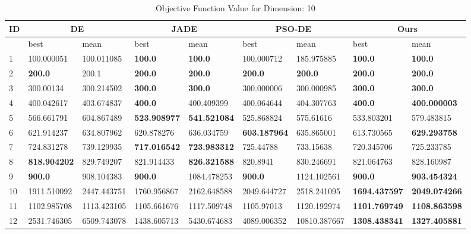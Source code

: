 \begingroup
\renewcommand\arraystretch{0.7}
\begin{table*}[b]
\centering
\caption{Objective Function Value for Dimension: 10}
 \begin{tabular}{|p{0.8cm}|p{1.6cm}|p{1.6cm}|p{1.6cm}|p{1.6cm}|p{1.6cm}|p{1.6cm}|p{1.6cm}|p{1.6cm}|} 
 \hline
 ID & \multicolumn{2}{c|}{DE} & \multicolumn{2}{c|}{JADE} & \multicolumn{2}{c|}{PSO-DE} & \multicolumn{2}{c|}{Ours} \\
 \hline
    & best & mean & best & mean & best & mean & best & mean \\ [0.5ex] 
 \hline
1  & 100.000051 & 100.011085 & \textbf{100.0} & \textbf{100.0} & 100.000712 & 185.975885 & \textbf{100.0} & \textbf{100.0} \\ 
2  & \textbf{200.0} & 200.1 & \textbf{200.0} & \textbf{200.0} & \textbf{200.0} & \textbf{200.0} & \textbf{200.0} & \textbf{200.0} \\ 
3  & 300.00134 & 300.214502 & \textbf{300.0} & \textbf{300.0} & 300.000006 & 300.000985 & \textbf{300.0} & \textbf{300.0} \\ 
4  & 400.042617 & 403.674837 & \textbf{400.0} & 400.409399 & 400.064644 & 404.307763 & \textbf{400.0} & \textbf{400.000003} \\ 
5  & 566.661791 & 604.867489 & \textbf{523.908977} & \textbf{541.521084} & 525.868824 & 575.61616 & 533.803201 & 579.483815 \\ 
6  & 621.914237 & 634.807962 & 620.878276 & 636.034759 & \textbf{603.187964} & 635.865001 & 613.730565 & \textbf{629.293758} \\ 
7  & 724.831278 & 739.129935 & \textbf{717.016542} & \textbf{723.983312} & 725.44788 & 733.15638 & 720.345706 & 725.233785 \\ 
8  & \textbf{818.904202} & 829.749207 & 821.914433 & \textbf{826.321588} & 820.8941 & 830.246691 & 821.064763 & 828.160987 \\ 
9  & \textbf{900.0} & 908.104383 & \textbf{900.0} & 1084.478253 & \textbf{900.0} & 1124.102561 & \textbf{900.0} & \textbf{903.454324} \\ 
10  & 1911.510092 & 2447.443751 & 1760.956867 & 2162.648588 & 2049.644727 & 2518.241095 & \textbf{1694.437597} & \textbf{2049.074266} \\ 
11  & 1102.985708 & 1113.423105 & 1105.661676 & 1117.509748 & 1105.97013 & 1120.192974 & \textbf{1101.769749} & \textbf{1108.863598} \\ 
12  & 2531.746305 & 6509.743078 & 1438.605713 & 5430.674683 & 4089.006352 & 10810.387667 & \textbf{1308.438341} & \textbf{1327.405881} \\ 

\end{tabular}
\end{table*}
